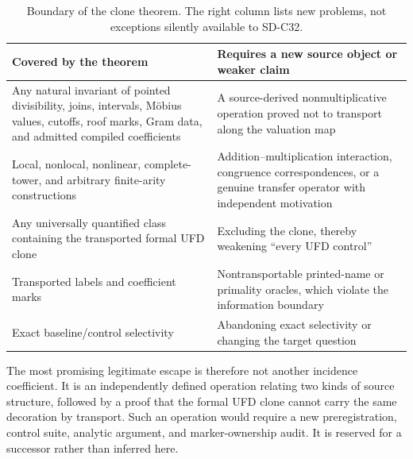 \begin{table}[t]
\centering
\small
\caption{Boundary of the clone theorem.  The right column lists new problems,
not exceptions silently available to SD-C32.}
\label{tab:boundary}
\begin{tabularx}{\textwidth}{Y Y}
\toprule
Covered by the theorem & Requires a new source object or weaker claim\\
\midrule
Any natural invariant of pointed divisibility, joins, intervals, M{\"o}bius
values, cutoffs, roof marks, Gram data, and admitted compiled coefficients &
A source-derived nonmultiplicative operation proved not to transport along
the valuation map\\
Local, nonlocal, nonlinear, complete-tower, and arbitrary finite-arity
constructions &
Addition--multiplication interaction, congruence correspondences, or a
genuine transfer operator with independent motivation\\
Any universally quantified class containing the transported formal UFD
clone &
Excluding the clone, thereby weakening “every UFD control”\\
Transported labels and coefficient marks &
Nontransportable printed-name or primality oracles, which violate the
information boundary\\
Exact baseline/control selectivity &
Abandoning exact selectivity or changing the target question\\
\bottomrule
\end{tabularx}
\end{table}

The most promising legitimate escape is therefore not another incidence
coefficient.  It is an independently defined operation relating two kinds
of source structure, followed by a proof that the formal UFD clone cannot
carry the same decoration by transport.  Such an operation would require a
new preregistration, control suite, analytic argument, and marker-ownership
audit.  It is reserved for a successor rather than inferred here.
